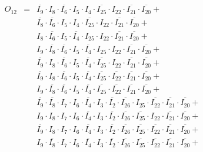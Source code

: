 \documentclass[a4paper,russian]{report}
\begin{document}
 \begin{eqnarray*}
    O_{12} & = & \overline{I_{9}} \cdotp I_{8} \cdotp \overline{I_{6}} \cdotp I_{5} \cdotp I_{4} \cdotp \overline{I_{25}} \cdotp I_{22} \cdotp \overline{I_{21}} \cdotp \overline{I_{20}} + \\
	& &  \overline{I_{8}} \cdotp \overline{I_{6}} \cdotp I_{5} \cdotp I_{4} \cdotp \overline{I_{25}} \cdotp I_{22} \cdotp \overline{I_{21}} \cdotp \overline{I_{20}} + \\
	& &  I_{8} \cdotp \overline{I_{6}} \cdotp I_{5} \cdotp \overline{I_{4}} \cdotp I_{25} \cdotp I_{22} \cdotp \overline{I_{21}} \cdotp \overline{I_{20}} + \\
	& &  I_{9} \cdotp \overline{I_{8}} \cdotp \overline{I_{6}} \cdotp I_{5} \cdotp \overline{I_{4}} \cdotp I_{25} \cdotp I_{22} \cdotp \overline{I_{21}} \cdotp \overline{I_{20}} + \\
	& &  \overline{I_{9}} \cdotp I_{8} \cdotp \overline{I_{6}} \cdotp I_{5} \cdotp \overline{I_{4}} \cdotp \overline{I_{25}} \cdotp I_{22} \cdotp \overline{I_{21}} \cdotp \overline{I_{20}} + \\
	& &  \overline{I_{9}} \cdotp I_{8} \cdotp \overline{I_{6}} \cdotp I_{5} \cdotp \overline{I_{4}} \cdotp \overline{I_{25}} \cdotp \overline{I_{22}} \cdotp \overline{I_{21}} \cdotp \overline{I_{20}} + \\
	& &  I_{9} \cdotp \overline{I_{8}} \cdotp \overline{I_{6}} \cdotp I_{5} \cdotp \overline{I_{4}} \cdotp \overline{I_{25}} \cdotp \overline{I_{22}} \cdotp \overline{I_{21}} \cdotp \overline{I_{20}} + \\
	& &  \overline{I_{9}} \cdotp \overline{I_{8}} \cdotp I_{7} \cdotp I_{6} \cdotp \overline{I_{4}} \cdotp I_{3} \cdotp \overline{I_{2}} \cdotp \overline{I_{26}} \cdotp I_{25} \cdotp \overline{I_{22}} \cdotp \overline{I_{21}} \cdotp \overline{I_{20}} + \\
	& &  I_{9} \cdotp I_{8} \cdotp I_{7} \cdotp I_{6} \cdotp \overline{I_{4}} \cdotp I_{3} \cdotp \overline{I_{2}} \cdotp \overline{I_{26}} \cdotp \overline{I_{25}} \cdotp I_{22} \cdotp \overline{I_{21}} \cdotp \overline{I_{20}} + \\
	& &  \overline{I_{9}} \cdotp I_{8} \cdotp I_{7} \cdotp I_{6} \cdotp \overline{I_{4}} \cdotp I_{3} \cdotp \overline{I_{2}} \cdotp \overline{I_{26}} \cdotp \overline{I_{25}} \cdotp \overline{I_{22}} \cdotp \overline{I_{21}} \cdotp \overline{I_{20}} + \\
	& &  I_{9} \cdotp \overline{I_{8}} \cdotp I_{7} \cdotp I_{6} \cdotp \overline{I_{4}} \cdotp I_{3} \cdotp \overline{I_{2}} \cdotp \overline{I_{26}} \cdotp \overline{I_{25}} \cdotp \overline{I_{22}} \cdotp \overline{I_{21}} \cdotp \overline{I_{20}} + \\

\end{eqnarray*}
\end{document}
